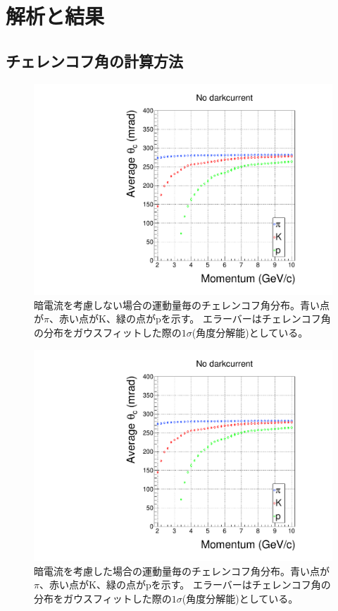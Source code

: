 \section{解析と結果}

\subsection{チェレンコフ角の計算方法}


\begin{figure}
  \centering
  \includegraphics[width=15cm,page=1]{images/chapter4/angleAndMultiGraph.pdf}
  \caption{
    暗電流を考慮しない場合の運動量毎のチェレンコフ角分布。青い点が$\pi$、赤い点がK、緑の点がpを示す。
    エラーバーはチェレンコフ角の分布をガウスフィットした際の$1\sigma$(角度分解能)としている。
  }
  \label{fig:angleMultiGraph1}
\end{figure}

\begin{figure}
  \centering
  \includegraphics[width=15cm,page=2]{images/chapter4/angleAndMultiGraph.pdf}
  \caption{
    暗電流を考慮した場合の運動量毎のチェレンコフ角分布。青い点が$\pi$、赤い点がK、緑の点がpを示す。
    エラーバーはチェレンコフ角の分布をガウスフィットした際の$1\sigma$(角度分解能)としている。
  }
  \label{fig:angleMultiGraph2}
\end{figure}

